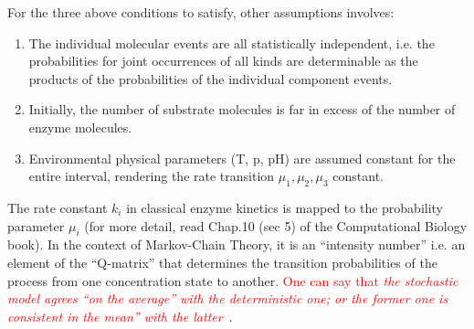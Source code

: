 For the three above conditions to satisfy, other assumptions involves:
\begin{enumerate}
\item The individual molecular events are all statistically
  independent, i.e. the probabilities for joint occurrences of all
  kinds are determinable as the products of the probabilities of the
  individual component events.
\item Initially, the number of substrate molecules is far in excess of
  the number of enzyme molecules.
\item Environmental physical parameters (T, p, pH) are assumed
  constant for the entire interval, rendering the rate transition
  $\mu_1, \mu_2, \mu_3$ constant.
\end{enumerate}
The rate constant $k_i$ in classical enzyme kinetics is mapped to the
probability parameter $\mu_i$ (for more detail, read Chap.10 (sec 5)
of the Computational Biology book). In the context of Markov-Chain
Theory, it is an ``intensity number'' i.e. an element of the
``Q-matrix'' that determines the transition probabilities of the
process from one concentration state to another.
\textcolor{red}{One can say that
  {\it the stochastic model agrees ``on the average'' with the
    deterministic one; or the former one is consistent in the mean''
    with the latter}}~\citep{bartholomay1962errt}.

